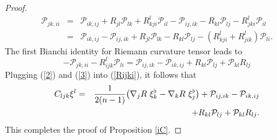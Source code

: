 \documentclass[10pt,a4paper]{amsart}
\begin{document}
\begin{proof}
\begin{eqnarray*}
           \mathcal P_{jk,ii}&=&\mathcal P_{ik,ij}+R_{jl}\mathcal P_{lk}+R^l_{kji}\mathcal P_{il}-\mathcal P_{ij,ik}-R_{kl}\mathcal P_{lj}-R^l_{jki}\mathcal P_{il} \\
              &=&\mathcal P_{ik,ij}-\mathcal P_{ij,ik}+R_{jl}\mathcal P_{lk}-R_{kl}\mathcal P_{lj}-(R^l_{kji}+R^l_{jik})\mathcal P_{li}.
           \end{eqnarray*}
           The first Bianchi identity for Riemann curvature tensor leads to
           \begin{equation}\label{3}
             -\mathcal{P}_{jk,ii}-R_{ijk}^l\mathcal{P}_{li}=\mathcal P_{ij,ik}-\mathcal P_{ik,ij}+R_{kl}\mathcal P_{lj}+\mathcal P_{kl}R_{lj}
           \end{equation}
            Plugging (\ref{2}) and (\ref{3}) into (\ref{Rijki}), it follows that
            \begin{eqnarray*}
            C_{ljk}\xi^l&=&\frac{1}{2(n-1)}\big({\nabla_j{\rm{R}} ~\xi_k^{\flat}-\nabla_k\rm{R}} ~\xi_j^{\flat}\big)+\mathcal P_{ij,ik}-\mathcal P_{ik,ij}\\
            &&+R_{kl}\mathcal P_{lj}+\mathcal P_{kl}R_{lj}.
            \end{eqnarray*}
           This completes the proof of Proposition \ref{iC}.
    \end{proof}
\end{document}
